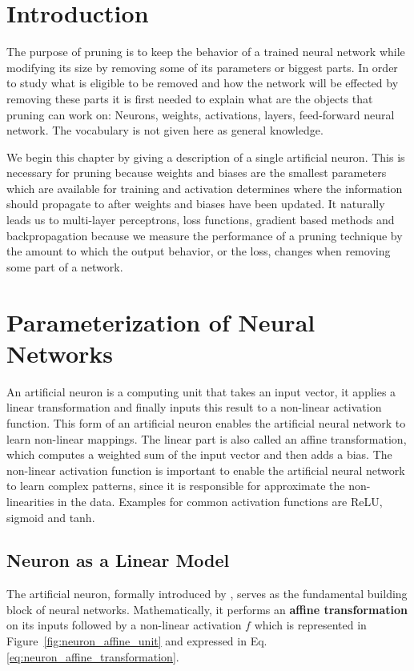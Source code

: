 \section{Introduction}

The purpose of pruning is to keep the behavior of a trained neural network while modifying its size by removing some of its parameters or biggest parts. In order to study what is eligible to be removed and how the network will be effected by removing these parts it is first needed to explain what are the objects that pruning can work on: Neurons, weights, activations, layers, feed-forward neural network. The vocabulary is not given here as general knowledge.

We begin this chapter by giving a description of a single artificial neuron. This is necessary for pruning because weights and biases are the smallest parameters which are available for training and activation determines where the information should propagate to after weights and biases have been updated. It naturally leads us to multi-layer perceptrons, loss functions, gradient based methods and backpropagation because we measure the performance of a pruning technique by the amount to which the output behavior, or the loss, changes when removing some part of a network\cite{Goodfellow2016,Rumelhart1986}.


\newpage
\section{Parameterization of Neural Networks}
An artificial neuron is a computing unit that takes an input vector, it applies a linear transformation and finally inputs this result to a non-linear activation function. This form of an artificial neuron enables the artificial neural network to learn non-linear mappings. The linear part is also called an affine transformation, which computes a weighted sum of the input vector and then adds a bias. The non-linear activation function is important to enable the artificial neural network to learn complex patterns, since it is responsible for approximate the non-linearities in the data. Examples for common activation functions are ReLU, sigmoid and tanh.

\subsection{Neuron as a Linear Model}

The artificial neuron, formally introduced by \cite{McCulloch1943}, serves as the fundamental building block of neural networks. Mathematically, it performs an \textbf{affine transformation} on its inputs followed by a non-linear activation $f$ which is represented in Figure~\ref{fig:neuron_affine_unit} and expressed in Eq.\eqref{eq:neuron_affine_transformation}.

